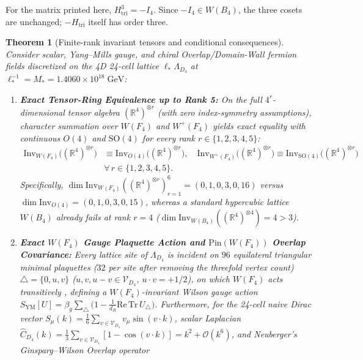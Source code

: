 \documentclass[11pt,a4paper]{article}
\newtheorem{theorem}{Theorem}[section]
\begin{document}
For the matrix printed here, $H_{\mathrm{tri}}^3=-I_4$. Since $-I_4\in W(B_4)$, the three cosets are unchanged; $-H_{\mathrm{tri}}$ itself has order three.

\begin{theorem}[Finite-rank invariant tensors and conditional consequences]
\label{thm:wf4-shield}
Consider scalar, Yang--Mills gauge, and chiral Overlap/Domain-Wall fermion fields discretized on the 4D 24-cell lattice $\ell_*\Lambda_{D_4}$ at $\ell_*^{-1} = M_* = 1.4060\times 10^{18}\;\mathrm{GeV}$:
\begin{enumerate}[label=(\roman*),leftmargin=1.9em,itemsep=2pt]
\item \textbf{Exact Tensor-Ring Equivalence up to Rank 5:} On the full $4^r$-dimensional tensor algebra $(\mathbb{R}^4)^{\otimes r}$ (with zero index-symmetry assumptions), character summation over $W(F_4)$ and $W^+(F_4)$ yields exact equality with continuous $O(4)$ and $\mathrm{SO}(4)$ for every rank $r \in \{1,2,3,4,5\}$:
\begin{equation}
\begin{aligned}
\mathrm{Inv}_{W(F_4)}\!\bigl((\mathbb{R}^4)^{\otimes r}\bigr) &\equiv \mathrm{Inv}_{O(4)}\!\bigl((\mathbb{R}^4)^{\otimes r}\bigr), \quad
\mathrm{Inv}_{W^+(F_4)}\!\bigl((\mathbb{R}^4)^{\otimes r}\bigr) \equiv \mathrm{Inv}_{\mathrm{SO}(4)}\!\bigl((\mathbb{R}^4)^{\otimes r}\bigr) \\
&\forall\, r \in \{1,2,3,4,5\}.
\end{aligned}
\label{eq:tensor-ring-equivalence}
\end{equation}
Specifically, $\dim\mathrm{Inv}_{W(F_4)}((\mathbb{R}^4)^{\otimes r})_{r=1}^6 = (0, 1, 0, 3, 0, 16)$ versus $\dim\mathrm{Inv}_{O(4)} = (0, 1, 0, 3, 0, 15)$, whereas a standard hypercubic lattice $W(B_4)$ already fails at rank $r = 4$ ($\dim\mathrm{Inv}_{W(B_4)}((\mathbb{R}^4)^{\otimes 4}) = 4 > 3$).
\item \textbf{Exact $W(F_4)$ Gauge Plaquette Action and $\mathrm{Pin}(W(F_4))$ Overlap Covariance:} Every lattice site of $\Lambda_{D_4}$ is incident on $96$ equilateral triangular minimal plaquettes ($32$ per site after removing the threefold vertex count) $\triangle = \{0, u, v\}$ ($u, v, u-v \in \mathcal{V}_{D_4}$, $u\cdot v = +1/2$), on which $W(F_4)$ acts transitively \cite{Celmaster1982}, defining a $W(F_4)$-invariant Wilson gauge action $S_{\mathrm{YM}}[U] = \beta_g\sum_{\triangle}\bigl(1 - \frac{1}{d_R}\mathrm{Re}\,\mathrm{Tr}\,U_{\triangle}\bigr)$. Furthermore, for the 24-cell naive Dirac vector $S_\mu(k) = \frac{1}{6}\sum_{v\in\mathcal{V}_{D_4}} v_\mu\sin(v\cdot k)$, scalar Laplacian $\widehat{C}_{D_4}(k) = \frac{1}{3}\sum_{v\in\mathcal{V}_{D_4}}[1 - \cos(v\cdot k)] = k^2 + \mathcal{O}(k^6)$, and Neuberger's Ginsparg--Wilson Overlap operator \cite{Neuberger1998,Luscher1998}

\end{enumerate}
\end{theorem}
\end{document}
